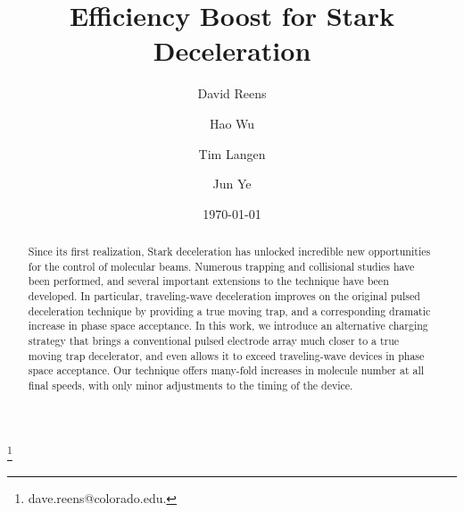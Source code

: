 \documentclass[%
 reprint,
 amsmath,amssymb,
 aps,
pra,
]{revtex4-1}
\begin{document}
\title{Efficiency Boost for Stark Deceleration}%

\author{David Reens}
\thanks{dave.reens@colorado.edu.}

\author{Hao Wu}

\author{Tim Langen}%

\author{Jun Ye}


\date{\today}


\begin{abstract}
Since its first realization, Stark deceleration has unlocked incredible new opportunities for the control of molecular beams. 
Numerous trapping and collisional studies have been performed, and several important extensions to the technique have been developed. 
In particular, traveling-wave deceleration improves on the original pulsed deceleration technique by providing a true moving trap, and a corresponding dramatic increase in phase space acceptance.
In this work, we introduce an alternative charging strategy that brings a conventional pulsed electrode array much closer to a true moving trap decelerator, and even allows it to exceed traveling-wave devices in phase space acceptance.
Our technique offers many-fold increases in molecule number at all final speeds, with only minor adjustments to the timing of the device.
\end{abstract}

\maketitle


\end{document}
